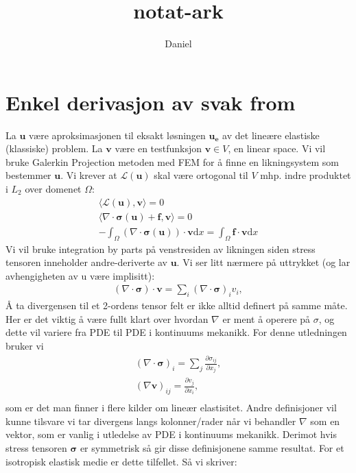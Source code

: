 \documentclass[a4paper]{article}
\begin{document}
\title{notat-ark}
\author{Daniel}
\maketitle
\section{Enkel derivasjon av svak from}
La $\boldsymbol{u}$ være aproksimasjonen til eksakt løsningen $\boldsymbol{u_e}$ av det lineære elastiske (klassiske) problem. La $\boldsymbol{v}$ være en testfunksjon $\boldsymbol{v} \in V$, en linear space. Vi vil bruke Galerkin Projection metoden med FEM for å finne en likningsystem som bestemmer $\boldsymbol{u}$.
Vi krever at $\mathcal{L}(\boldsymbol{u})$ skal være ortogonal til $V$ mhp. indre produktet i $L_2$ over domenet $\Omega$:
\begin{align*}
\langle \mathcal{L}(\boldsymbol{u}),\boldsymbol{v} \rangle = 0\\
\langle \nabla \cdot \boldsymbol{\sigma(u)}+\boldsymbol{f},\boldsymbol{v} \rangle = 0\\
-\int_{\Omega}(\nabla \cdot \boldsymbol{\sigma(u)})\cdot \boldsymbol{v}\mathrm{d}x = \int_{\Omega}\boldsymbol{f}\cdot \boldsymbol{v}\mathrm{d}x
\end{align*}
Vi vil bruke integration by parts på venstresiden av likningen siden stress tensoren inneholder andre-deriverte av $\boldsymbol{u}$. Vi ser litt nærmere på uttrykket (og lar avhengigheten av u være implisitt):
\begin{align*}
(\nabla \cdot \boldsymbol{\sigma})\cdot \boldsymbol{v} = \sum_i  (\nabla \cdot \boldsymbol{\sigma})_i v_i,
\end{align*}
Å ta divergensen til et 2-ordens tensor felt er ikke alltid definert på samme måte. Her er det viktig å være fullt klart over hvordan $\nabla$ er ment å operere på $\sigma$, og dette vil variere fra PDE til PDE i kontinuums mekanikk. For denne utledningen bruker vi
\begin{align*}
(\nabla \cdot \boldsymbol{\sigma})_{i} = \sum_{j}\frac{\partial \sigma_{ij}}{\partial x_j},\\
(\nabla \boldsymbol{v})_{ij} = \frac{\partial v_j}{\partial x_i},\\
\end{align*}
som er det man finner i flere kilder om lineær elastisitet. Andre definisjoner vil kunne tilsvare vi tar divergens langs kolonner/rader når vi behandler $\nabla$ som en vektor, som er vanlig i utledelse av PDE i kontinuums mekanikk. Derimot hvis stress tensoren $\boldsymbol{\sigma}$ er symmetrisk så gir disse definisjonene samme resultat. For et isotropisk elastisk medie er dette tilfellet. Så vi skriver:
\end{document}
